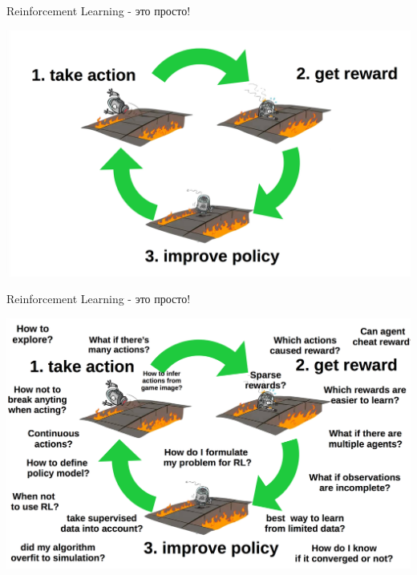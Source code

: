 \documentclass[notes,12pt, aspectratio=169]{beamer}
\begin{document}
\begin{frame}{Reinforcement Learning - это просто!}
\begin{center}
	\includegraphics[width=.82\linewidth]{rl_easy1.png}
\end{center}
\end{frame}

\begin{frame}{Reinforcement Learning - это просто!}
\begin{center}
\includegraphics[width=.82\linewidth]{rl_easy2.png}
\end{center}
\end{frame}
\end{document}
